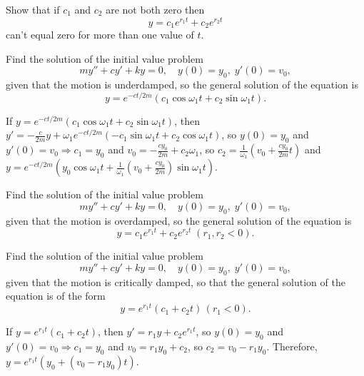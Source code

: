 \documentclass{ximera}
\begin{document}
\begin{problem}\label{exer:6.2.23}
Show that if $c_1$ and $c_2$ are not both zero then
$$
y=c_1e^{r_1t}+c_2e^{r_2t}
$$
 can't equal zero for more than one
value of $t$.
\end{problem}

\begin{problem}\label{exer:6.2.24}
Find the solution of the initial value problem
$$
my''+cy'+ky=0,\quad y(0)=y_0,\;y'(0)=v_0,
$$
given that the motion is underdamped, so  the general solution of
the equation is
$$
y=e^{-ct/2m}(c_1\cos\omega_1t+c_2\sin\omega_1t).
$$

\begin{solution}
    If $y=e^{-ct/2m}(c_1\cos\omega_1t+c_2\sin\omega_1t)$, then
$y'=-\frac{c}{2m}y+\omega_1
e^{-ct/2m}(-c_1\sin\omega_1t+c_2\cos\omega_1t)$, so $y(0)=y_0$ and
$y'(0)=v_0\Rightarrow c_1=y_0$ and
$v_0=-\frac{cy_0}{2m}+c_2\omega_1$, so $c_2=\frac{1}{\omega_1}
\left(v_0+\frac{cy_0}{2m}t\right)$ and $y=e^{-ct/2m}
\left(y_0\cos\omega_1t+\frac{1}{\omega_1}\left(v_0+\frac{cy_0}{
2m}\right)\sin\omega_1t\right)$.
\end{solution}
\end{problem}

\begin{problem}\label{exer:6.2.25}
Find the solution of the initial value problem
$$
my''+cy'+ky=0,\quad y(0)=y_0,\;y'(0)=v_0,
$$
given that the motion is overdamped, so  the general solution of
the equation is
$$
y=c_1e^{r_1t}+c_2e^{r_2t}\;(r_1,r_2<0).
$$
\end{problem}

\begin{problem}\label{exer:6.2.26}
Find the solution of the initial value problem
$$
my''+cy'+ky=0,\quad y(0)=y_0,\;y'(0)=v_0,
$$
given that the motion is critically damped, so that the general
solution of the equation is of the form
$$
y=e^{r_1t}(c_1+c_2t)\,(r_1<0).
$$

\begin{solution}
    If $y=e^{r_1t}(c_1+c_2t)$, then $y'=r_1y+c_2e^{r_1t}$, so $y(0)=y_0$
and $y'(0)=v_0\Rightarrow c_1=y_0$ and $v_0=r_1y_0+c_2$, so
$c_2=v_0-r_1y_0$. Therefore,
$y=e^{r_1t}\left(y_0+(v_0-r_1y_0)t\right)$.
\end{solution}
\end{problem}
\end{document}
